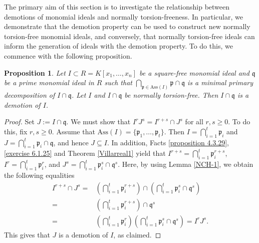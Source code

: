 \documentclass[11pt]{amsart}
\newtheorem{proposition}[theorem]{Proposition}
\begin{document}
 The primary aim of this section is to investigate the relationship between demotions of monomial ideals and normally torsion-freeness. 
 In particular, we demonstrate that the demotion property can be used to construct new normally torsion-free monomial ideals, 
   and conversely, that normally torsion-free ideals can inform the generation of ideals with the demotion property.
 To do this, we commence with the following proposition. 

  
  \begin{proposition} \label{Demotion-3}
  Let $I\subset R=K[x_1, \ldots, x_n]$  be a  square-free monomial ideal  and  $\mathfrak{q}$ be  a prime monomial ideal in $R$ such that $\bigcap_{\mathfrak{p}\in \mathrm{Ass}(I)}\mathfrak{p} \cap \mathfrak{q}$  is  a minimal primary decomposition of  
$I \cap \mathfrak{q}$.   Let  $I$ and $I \cap \mathfrak{q}$ be  normally torsion-free.  
Then $I\cap \mathfrak{q}$ is a demotion of $I$. 
  \end{proposition}
  
 
\begin{proof}
Set $J:=I\cap \mathfrak{q}$. We must show that $I^rJ^s=I^{r+s} \cap J^s$ for all $r,s\geq 0$. To do this, fix $r,s\geq 0$. Assume that 
$\mathrm{Ass}(I)=\{\mathfrak{p}_1, \ldots, \mathfrak{p}_t\}$. Then  $I=\bigcap_{i=1}^t\mathfrak{p}_i$ 
and $J=\bigcap_{i=1}^{t}\mathfrak{p}_i\cap \mathfrak{q}$,  and hence  $J\subseteq I$. In addition, 
  Facts \ref{proposition 4.3.29}, \ref{exercise 6.1.25} and Theorem \ref{Villarreal1} yield that 
 $I^{r+s}=\bigcap_{i=1}^{t}{\mathfrak{p}^{r+s}_i}$, $I^r=\bigcap_{i=1}^{t}{\mathfrak{p}^r_i}$, and  $J^s=\bigcap_{i=1}^{t}{\mathfrak{p}^s_i}\cap \mathfrak{q}^s$. Here, by using Lemma   \ref{NCH-1}, we obtain the following equalities
 \begin{align*}  
I^{r+s} \cap J^s=& \left(\bigcap_{i=1}^{t}\mathfrak{p}_i^{r+s}\right) \cap  \left(\bigcap_{i=1}^{t}\mathfrak{p}_i^{s}\cap    \mathfrak{q}^{s}\right)\\
=& \left(\bigcap_{i=1}^{t}\mathfrak{p}_i^{r+s}\right) \cap     \mathfrak{q}^{s}\\
=& \left(\bigcap_{i=1}^{t}\mathfrak{p}_i^{r}\right)  \left(\bigcap_{i=1}^{t}\mathfrak{p}_i^{s}  \cap \mathfrak{q}^{s}\right)=I^rJ^s.
 \end{align*}
This gives that $J$ is a demotion of $I$, as claimed. 
\end{proof}
  
\end{document}
